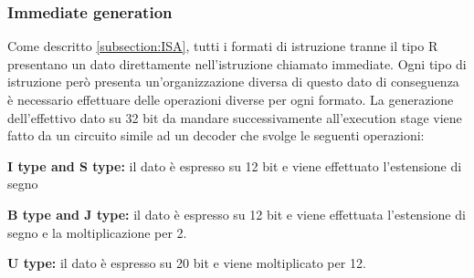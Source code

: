 \subsubsection{Immediate generation}
Come descritto \autoref{subsection:ISA}, tutti i formati di istruzione tranne il tipo R presentano un dato direttamente nell'istruzione chiamato immediate. Ogni tipo di istruzione però presenta un'organizzazione diversa di questo dato di conseguenza è necessario effettuare delle operazioni diverse per ogni formato. La generazione dell'effettivo dato su 32 bit da mandare successivamente all'execution stage viene fatto da un circuito simile ad un decoder che svolge le seguenti operazioni:
\begin{description}
    \item \textbf{I type and S type:} il dato è espresso su 12 bit e viene effettuato l'estensione di segno
    \item \textbf{B type and J type:} il dato è espresso su 12 bit e viene effettuata l'estensione di segno e la moltiplicazione per 2.
    \item \textbf{U type:} il dato è espresso su 20 bit e viene moltiplicato per 12.
\end{description}
